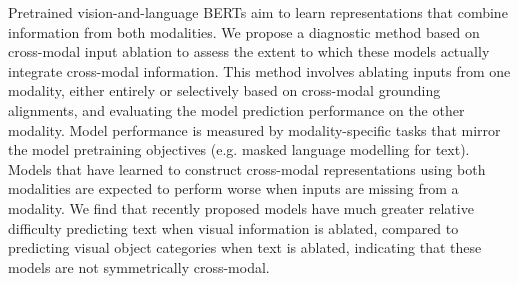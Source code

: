 Pretrained vision-and-language BERTs aim to learn representations that combine information from both modalities. We propose a diagnostic method based on cross-modal input ablation to assess the extent to which these models actually integrate cross-modal information. This method involves ablating inputs from one modality, either entirely or selectively based on cross-modal grounding alignments, and evaluating the model prediction  performance on the other modality. Model performance is measured by modality-specific tasks that mirror the model pretraining objectives (e.g. masked language modelling for text). Models that have learned to construct cross-modal representations using both modalities are expected to perform worse when inputs are missing from a modality. We find that recently proposed models have much greater relative difficulty predicting text when visual information is ablated, compared to predicting visual object categories when text is ablated, indicating that these models are not symmetrically cross-modal.
